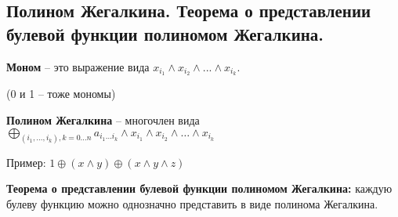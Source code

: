 \subsection{Полином Жегалкина. Теорема о представлении булевой функции полиномом Жегалкина.}

\textbf{Моном} -- это выражение вида $x_{i_1} \wedge x_{i_2} \wedge ... \wedge x_{i_k}$.

(0 и 1 -- тоже мономы)

\textbf{Полином Жегалкина} -- многочлен вида $\bigoplus\limits_{(i_1,\ldots,i_k), k = 0 \ldots n} a_{i_1\ldots i_k} \wedge x_{i_1} \wedge x_{i_2} \wedge \ldots \wedge x_{i_k}$

Пример: $1 \oplus (x \wedge y) \oplus (x \wedge y \wedge z)$

\textbf{Теорема о представлении булевой функции полиномом Жегалкина:} каждую булеву функцию можно однозначно представить в виде полинома Жегалкина.
